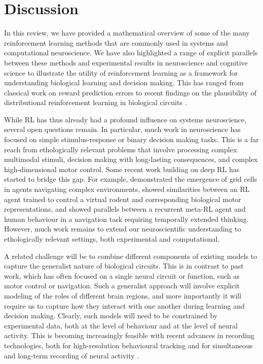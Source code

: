 \section{Discussion}
\label{sec:discussion}

In this review, we have provided a mathematical overview of some of the many reinforcement learning methods that are commonly used in systems and computational neuroscience.
We have also highlighted a range of explicit parallels between these methods and experimental results in neuroscience and cognitive science to illustrate the utility of reinforcement learning as a framework for understanding biological learning and decision making.
This has ranged from classical work on reward prediction errors \citep{schultz1997neural} to recent findings on the plausibility of distributional reinforcement learning in biological circuits \citep{dabney2020distributional}.

While RL has thus already had a profound influence on systems neuroscience, several open questions remain.
In particular, much work in neuroscience has focused on simple stimulus-response or binary decision making tasks.
This is a far reach from ethologically relevant problems that involve processing complex multimodal stimuli, decision making with long-lasting consequences, and complex high-dimensional motor control.
Some recent work building on deep RL has started to bridge this gap.
For example, \citet{banino2018vector} demonstrated the emergence of grid cells in agents navigating complex environments, \citet{aldarondo2024virtual} showed similarities between an RL agent trained to control a virtual rodent and corresponding biological motor representations, and \citet{jensen2023recurrent} showed parallels between a recurrent meta-RL agent and human behaviour in a navigation task requiring temporally extended thinking.
However, much work remains to extend our neuroscientific understanding to ethologically relevant settings, both experimental and computational.

A related challenge will be to combine different components of existing models to capture the generalist nature of biological circuits.
This is in contrast to past work, which has often focused on a single neural circuit or function, such as motor control or navigation.
Such a generalist approach will involve explicit modeling of the roles of different brain regions, and more importantly it will require us to capture how they interact with one another during learning and decision making.
Clearly, such models will need to be constrained by experimental data, both at the level of behaviour and at the level of neural activity.
This is becoming increasingly feasible with recent advances in recording technologies, both for high-resolution behavioural tracking \citep{mathis2018deeplabcut,dunn2021geometric} and for simultaneous and long-term recording of neural activity \citep{steinmetz2021neuropixels, pachitariu2016suite2p, dhawale2017automated}.

